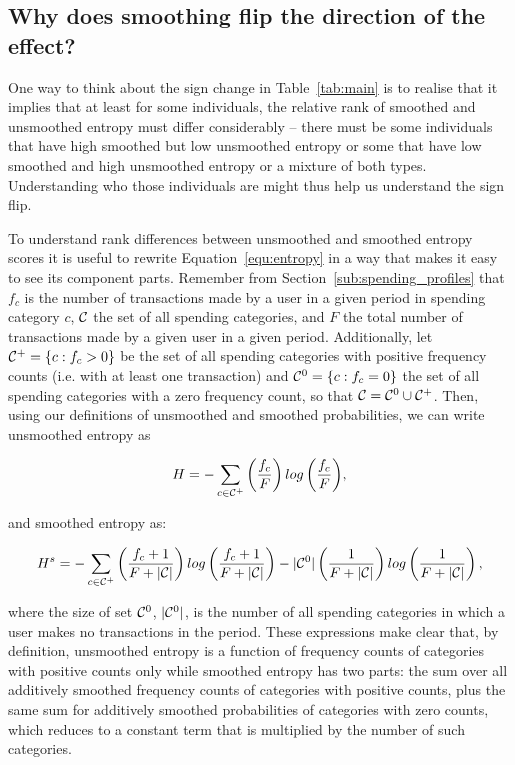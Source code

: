 \subsection{Why does smoothing flip the direction of the effect?}%
\label{sub:why_does_smoothing_flip_the_direction_of_the_effect}

One way to think about the sign change in Table~\ref{tab:main} is to realise
that it implies that at least for some individuals, the relative rank of
smoothed and unsmoothed entropy must differ considerably -- there must be some
individuals that have high smoothed but low unsmoothed entropy or some that have low smoothed and high unsmoothed entropy or a mixture of both types. Understanding who those individuals are might thus help us understand the sign
flip.

To understand rank differences between unsmoothed and smoothed entropy scores
it is useful to rewrite Equation~\ref{equ:entropy} in a way that makes it easy
to see its component parts. Remember from Section~\ref{sub:spending_profiles}
that $f_c$ is the number of transactions made by a user in a given period in
spending category $c$, $\mathcal{C}$ the set of all spending categories, and $F$ the
total number of transactions made by a given user in a given period.
Additionally, let $\mathcal{C}^{+} = \{c: f_c > 0\}$ be the set of all spending
categories with positive frequency counts (i.e.  with at least one transaction)
and $\mathcal{C}^{0} = \{c: f_c = 0\}$ the set of all spending categories with a zero
frequency count, so that $\mathcal{C} = \mathcal{C}^{0} \cup \mathcal{C}^{+}$. Then, using our
definitions of unsmoothed and smoothed probabilities, we can write unsmoothed
entropy as

\begin{equation}
\label{equ:entropy_us}
H = -\sum_{c \in \mathcal{C}^{+}}{\left(\frac{f_c}{F}\right)
log\left(\frac{f_c}{F}\right)},
\end{equation}

\noindent and smoothed entropy as:

\begin{equation}
\label{equ:entropy_s}
H^s = -\sum_{c \in \mathcal{C}^{+}}{\left(\frac{f_c + 1}{F + |\mathcal{C}|}\right)
log\left(\frac{f_c + 1}{F + |\mathcal{C}|}\right)}
- |\mathcal{C}^{0}|\left(\frac{1}{F + |\mathcal{C}|}\right)
log\left(\frac{1}{F + |\mathcal{C}|}\right),
\end{equation}

\noindent where the size of set $\mathcal{C}^{0}$, $|\mathcal{C}^{0}|$, is the number of all
spending categories in which a user makes no transactions in the period.
These expressions make clear that, by definition, unsmoothed entropy is a
function of frequency counts of categories with positive counts only while
smoothed entropy has two parts: the sum over all additively smoothed frequency
counts of categories with positive counts, plus the same sum for additively
smoothed probabilities of categories with zero counts, which reduces to a
constant term that is multiplied by the number of such categories.

